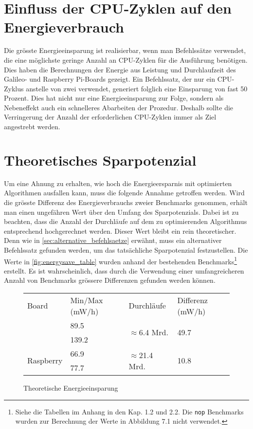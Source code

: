 \section{Einfluss der CPU-Zyklen auf den Energieverbrauch}
Die grösste Energieeinsparung ist realisierbar, wenn man Befehlssätze verwendet, die eine möglichste geringe Anzahl an CPU-Zyklen für die Ausführung benötigen. Dies haben die Berechnungen der Energie aus Leistung und Durchlaufzeit   des Galileo- und Raspberry Pi-Boards gezeigt. Ein Befehlssatz, der nur ein CPU-Zyklus anstelle von zwei verwendet, generiert folglich eine Einsparung von fast 50 Prozent. Dies hat nicht nur eine Energieeinsparung zur Folge, sondern als Nebeneffekt auch ein schnelleres Abarbeiten der Prozedur. Deshalb sollte die Verringerung der Anzahl der erforderlichen CPU-Zyklen immer als Ziel angestrebt werden.

\section{Theoretisches Sparpotenzial}
Um eine Ahnung zu erhalten, wie hoch die Energieersparnis mit optimierten Algorithmen ausfallen kann, muss die folgende Annahme getroffen werden. Wird die grösste Differenz des Energieverbrauchs zweier Benchmarks genommen, erhält man einen ungefähren Wert über den Umfang des Sparpotenzials. Dabei ist zu beachten, dass die Anzahl der Durchläufe auf dem zu optimierenden Algorithmus entsprechend hochgerechnet werden. Dieser Wert bleibt ein rein theoretischer. Denn wie in \autoref{sec:alternative_befehlsaetze} erwähnt, muss ein alternativer Befehlssatz gefunden werden, um das tatsächliche Sparpotenzial festzustellen. Die Werte in \autoref{fig:energysave_table} wurden anhand der bestehenden Benchmarks\footnote{Siehe die Tabellen im Anhang in den Kap. 1.2 und 2.2. Die \texttt{nop} Benchmarks wurden zur Berechnung der Werte in Abbildung 7.1 nicht verwendet.} erstellt. Es ist wahrscheinlich, dass durch die Verwendung einer umfangreicheren Anzahl von Benchmarks grössere Differenzen gefunden werden können.


\begin{figure}[H]
\center
\begin{tabular}{ |l|l|l|l| }
\hline
Board & Min/Max (mW/h) & Durchläufe & Differenz (mW/h) \\ \hhline{|=|=|=|=|}
\multirow{2}{*}{Galileo} & 89.5 & \multirow{2}{*}{$\approx$6.4 Mrd.} & \multirow{2}{*}{49.7} \\ 
 & 139.2 & &  \\ \hline
\multirow{2}{*}{Raspberry} & 66.9 & \multirow{2}{*}{$\approx$21.4 Mrd.} & \multirow{2}{*}{10.8} \\ 
 & 77.7 & &  \\
\hline
\end{tabular}
\caption{Theoretische Energieeinsparung}
\label{fig:energysave_table}
\end{figure}


